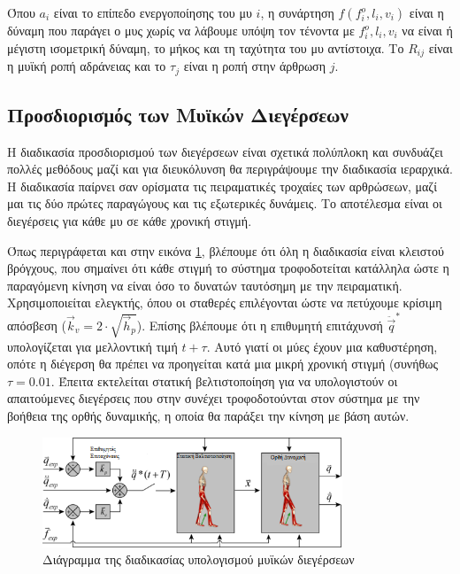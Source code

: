 Όπου $a_i$ είναι το επίπεδο ενεργοποίησης του μυ $i$, η συνάρτηση $f(f^{o}_{i}, l_{i}, v_{i})$ είναι η δύναμη που παράγει ο μυς χωρίς να λάβουμε υπόψη τον τένοντα με $f^{o}_{i}, l_{i}, v_{i}$ να είναι ή μέγιστη ισομετρική δύναμη, το μήκος και τη ταχύτητα του μυ αντίστοιχα. Το $R_{ij}$ είναι η μυϊκή ροπή αδράνειας και το $\tau_{j}$ είναι η ροπή στην άρθρωση $j$.

\subsection{Προσδιορισμός των Μυϊκών Διεγέρσεων}

Η διαδικασία προσδιορισμού των διεγέρσεων είναι σχετικά πολύπλοκη και συνδυάζει πολλές μεθόδους μαζί και για διευκόλυνση θα περιγράψουμε την διαδικασία ιεραρχικά. Η διαδικασία παίρνει σαν ορίσματα τις πειραματικές τροχαίες των αρθρώσεων, μαζί μαι τις δύο πρώτες παραγώγους και τις εξωτερικές δυνάμεις. Το αποτέλεσμα είναι οι διεγέρσεις για κάθε μυ σε κάθε χρονική στιγμή.

Όπως περιγράφεται και στην εικόνα \ref{fig:cmc-diagram}, βλέπουμε ότι όλη η διαδικασία είναι κλειστού βρόγχους, που σημαίνει ότι κάθε στιγμή το σύστημα τροφοδοτείται κατάλληλα ώστε η παραγόμενη κίνηση να είναι όσο το δυνατών ταυτόσημη με την πειραματική. Χρησιμοποιείται  ελεγκτής, όπου οι σταθερές επιλέγονται ώστε να πετύχουμε κρίσιμη απόσβεση ($\overrightarrow{k}_v = 2 \cdot \sqrt{\overrightarrow{h}_p}$). Επίσης βλέπουμε ότι η επιθυμητή επιτάχυνσή $\ddot{\overrightarrow{q}}^{*}$ υπολογίζεται για μελλοντική τιμή $t + \tau $. Αυτό γιατί οι μύες έχουν μια καθυστέρηση, οπότε η διέγερση θα πρέπει να προηγείται κατά μια μικρή χρονική στιγμή (συνήθως $\tau = 0.01$. Έπειτα εκτελείται στατική βελτιστοποίηση για να υπολογιστούν οι απαιτούμενες διεγέρσεις που στην συνέχει τροφοδοτούνται στον σύστημα με την βοήθεια της ορθής δυναμικής, η οποία θα παράξει την κίνηση με βάση αυτών.

\begin{figure}[H]
    \centering
    \includegraphics[width=0.8\textwidth]{methods/fig/cmc-diagram.png}
    \caption{Διάγραμμα της διαδικασίας υπολογισμού μυϊκών διεγέρσεων\cite{thelen06}}
    \label{fig:cmc-diagram}
\end{figure}

